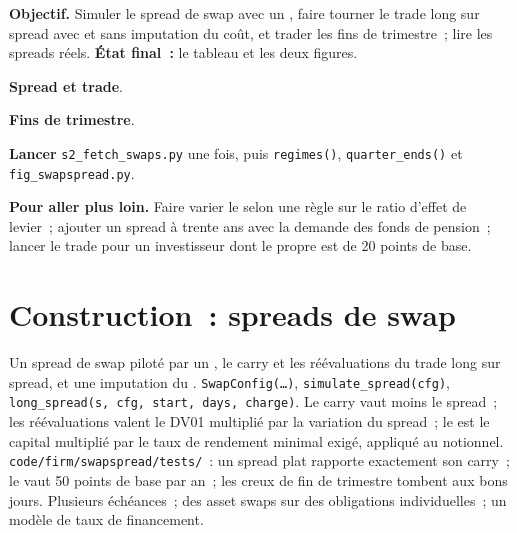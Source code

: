 \begin{tutorial}
\textbf{Objectif.} Simuler le spread de swap avec un , faire tourner le trade long sur spread avec et sans imputation du coût, et trader les fins de trimestre~;
lire les spreads réels. \textbf{État final~:} le tableau et les deux figures.
\begin{tutsteps}
\item \textbf{Spread et trade}.
\label{lst:s2:swap-spread-and-asset-swap-trades:model}
\item \textbf{Fins de trimestre}.
\label{lst:s2:swap-spread-and-asset-swap-trades:qe}
\item \textbf{Lancer} \texttt{s2\_fetch\_swaps.py} une fois, puis \texttt{regimes()}, \texttt{quarter\_ends()} et \texttt{fig\_swapspread.py}.
\end{tutsteps}
\textbf{Pour aller plus loin.} Faire varier le  selon une règle sur le ratio d'effet de levier~; ajouter un spread à trente ans avec la demande des fonds de pension~; lancer le trade
pour un investisseur dont le  propre est de 20 points de base.
\end{tutorial}

\section{Construction~: spreads de swap}\label{bld:s2:swap-spread-and-asset-swap-trades:swapspread}

\begin{build}
 Un spread de swap piloté par un , le carry et les réévaluations du trade long sur spread, et une imputation du .
 \texttt{SwapConfig(\dots)}, \texttt{simulate\_spread(cfg)}, \texttt{long\_spread(s, cfg, start, days, charge)}.
 Le carry vaut moins le spread~; les réévaluations valent le DV01 multiplié par la variation du spread~; le  est le capital multiplié par le taux de rendement minimal exigé, appliqué au notionnel.
 \texttt{code/firm/swapspread/tests/}~: un spread plat rapporte exactement son carry~; le  vaut 50 points de base par an~; les
creux de fin de trimestre tombent aux bons jours.
 Plusieurs échéances~; des asset swaps sur des obligations individuelles~; un modèle de taux de financement.
\end{build}

